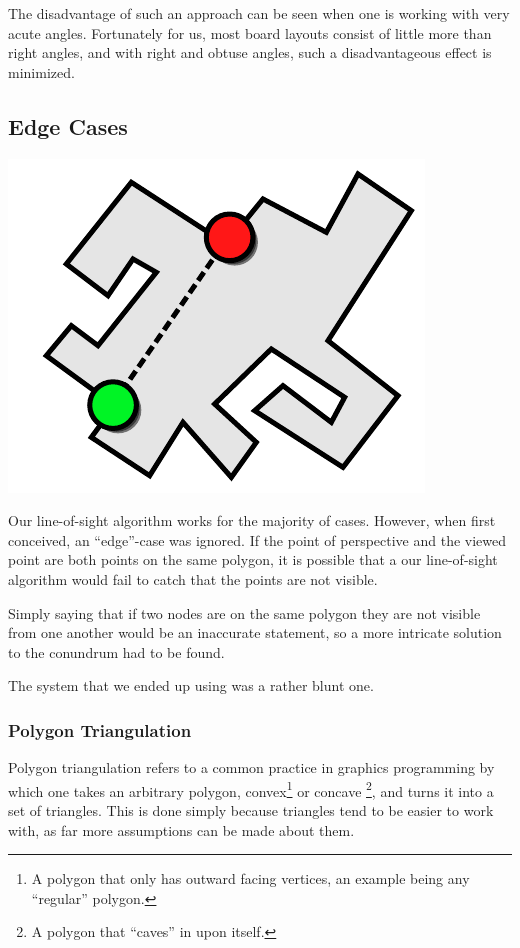 \documentclass[letterpaper, 12pt]{article}
\begin{document}
\begin{multicols}{2}
The disadvantage of such an approach can be seen when one is working with very
acute angles. Fortunately for us, most board layouts consist of little more than
right angles, and with right and obtuse angles, such a disadvantageous effect is
minimized.

\subsection{Edge Cases}

\includegraphics[width=\columnwidth]{img/line_of_sight_flaw.pdf}

Our line-of-sight algorithm works for the majority of cases. However, when first
conceived, an ``edge''-case was ignored. If the point of perspective and the
viewed point are both points on the same polygon, it is possible that a our
line-of-sight algorithm would fail to catch that the points are not visible.

Simply saying that if two nodes are on the same polygon they are not visible
from one another would be an inaccurate statement, so a more intricate solution
to the conundrum had to be found.

The system that we ended up using was a rather blunt one.

\subsubsection{Polygon Triangulation}

Polygon triangulation refers to a common practice in graphics programming by
which one takes an arbitrary polygon, convex\footnote{A polygon that only has
outward facing vertices, an example being any ``regular'' polygon.} or concave
\footnote{A polygon that ``caves'' in upon itself.}, and turns it into a set of
triangles. This is done simply because triangles tend to be easier to work with,
as far more assumptions can be made about them.


\end{multicols}
\end{document}
